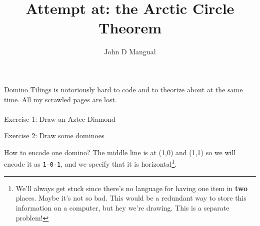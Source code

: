\documentclass[12pt]{article}
\title{\textbf{ Attempt at: the Arctic Circle Theorem }}
\author{John D Mangual}
\date{}
\newcommand{\bsq}[2]{
\fill[black](#1,#2)--(#1+1,#2)--(#1+1,#2+1)--(#1,#2+1)--cycle;
 }
\newcommand{\gsq}[2]{
\fill[black!60!white](#1,#2)--(#1+1,#2)--(#1+1,#2+1)--(#1,#2+1)--cycle;
 }
\newcommand{\wsq}[2]{
\fill[black!10!white](#1,#2)--(#1+1,#2)--(#1+1,#2+1)--(#1,#2+1)--cycle;
}
\begin{document}
\selectfont \fontsize{25}{30}\selectfont

\maketitle


\noindent 
Domino Tilings is notoriously hard to code and to theorize about at the same time.  All my scrawled pages are lost. \\ \\
Exercise 1: Draw an Aztec Diamond
\begin{center}
\end{center} \newpage
Exercise 2: Draw some dominoes

\begin{center}
\end{center}
How to encode one domino?  The middle line is at  (1,0) and (1,1) so we will encode it as \texttt{1-0-1}, and we specify that it is horizontal\footnote{We'll always get stuck since there's no language for having one item in \textbf{two} places.  Maybe it's not so bad.  This would be a redundant way to store this information on a computer, but hey we're drawing.  This is a separate problem!}. \\
\end{document}
